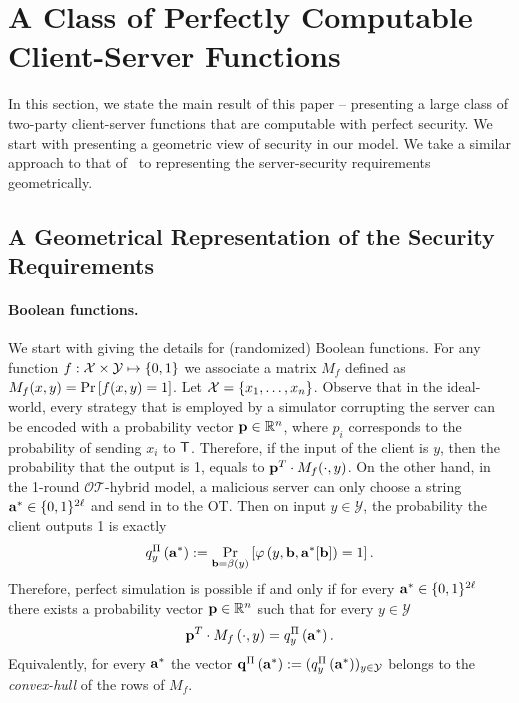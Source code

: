 \documentclass{llncs}
\newcommand{\OTfunc}{\mathcal{OT}}
\newcommand{\OThybrid}{\OTfunc\mbox{-}\text{hybrid}}
\newcommand{\X}{\mathcal{X}}
\newcommand{\Y}{\mathcal{Y}}
\newcommand{\p}{\myvec{p}}
\renewcommand{\q}{\myvec{q}}
\renewcommand{\b}{\myvec{b}}
\renewcommand{\a}{\myvec{a}}
\newcommand{\clnt}{\beta}
\newcommand{\local}{\varphi}
\begin{document}
\section{A Class of Perfectly Computable Client-Server Functions}\label{sec:main}
In this section, we state the main result of this paper -- presenting a large class of two-party client-server functions that are computable with perfect security. We start with presenting a geometric view of security in our model. We take a similar approach to that of~\cite{Ash14} to representing the server-security requirements geometrically.

\subsection{A Geometrical Representation of the Security Requirements}
\paragraph{Boolean functions.}
We start with giving the details for (randomized) Boolean functions. For any function $f:\X\times\Y\mapsto\zo$ we associate a matrix $M_f$ defined as  $M_f(x,y)=\Pr\left[f(x,y)=1\right]$. Let $\X=\set{x_1,\ldots,x_n}$.
Observe that in the ideal-world, every strategy that is employed by a simulator corrupting the server can be encoded with a probability vector $\p\in\R^{n}$, where $p_i$ corresponds to the probability of sending $x_i$ to $\mathsf{T}$. Therefore, if the input of the client is $y$, then the probability that the output is 1, equals to $\p^T\cdot M_f(\cdot,y)$. 
On the other hand, in the 1-round $\OThybrid$ model, a malicious server can only choose a string $\a^*\in\zo^{2\ell}$ and send in to the OT. Then on input $y\in\Y$, the probability the client outputs 1 is exactly
$$q^{\Pi}_y\of{\a^*}:=\Pr_{\b=\clnt\of{y}}\left[\local\of{y,\b,\a^*[\b]}=1\right].$$
Therefore, perfect simulation is possible if and only if for every $\a^*\in\zo^{2\ell}$ there exists a probability vector $\p\in\R^n$ such that for every $y\in\Y$
$$\p^T\cdot M_f\of{\cdot,y}=q^{\Pi}_y\of{\a^*}.$$
Equivalently, for every $\a^*$ the vector $\q^{\Pi}\of{\a^*}:=(q^{\Pi}_y\of{\a^*})_{y\in\Y}$ belongs to the \emph{convex-hull} of the rows of $M_f$.
\end{document}
